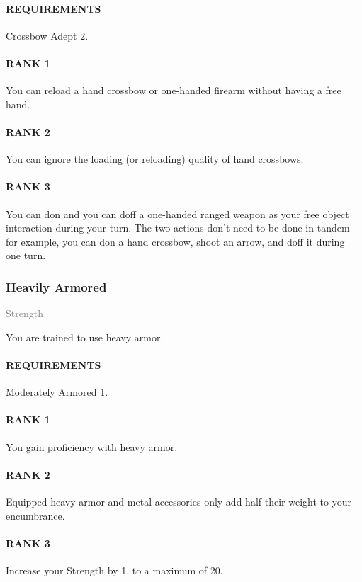 \paragraph{REQUIREMENTS} Crossbow Adept 2.
\paragraph{RANK 1} You can reload a hand crossbow or one-handed firearm without having a free hand.
\paragraph{RANK 2} You can ignore the loading (or reloading) quality of hand crossbows.
\paragraph{RANK 3} You can don and you can doff a one-handed ranged weapon as your free object interaction during your turn.
The two actions don't need to be done in tandem - for example, you can don a hand crossbow, shoot an arrow, and doff it during one turn.

\subsubsection{Heavily Armored} \label{feat::heavilyarmored}
\small{\textcolor{gray}{Strength}}

\normalsize
You are trained to use heavy armor.
\paragraph{REQUIREMENTS} Moderately Armored 1.
\paragraph{RANK 1} You gain proficiency with heavy armor.
\paragraph{RANK 2} Equipped heavy armor and metal accessories only add half their weight to your encumbrance.
\paragraph{RANK 3} Increase your Strength by 1, to a maximum of 20.


